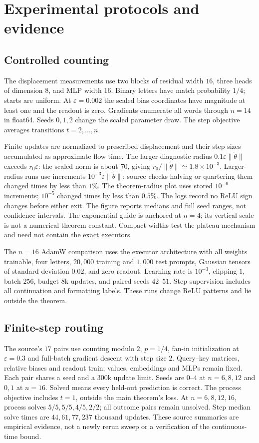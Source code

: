 \section{Experimental protocols and evidence}\label{app:experiments}
\subsection{Controlled counting}
The displacement measurements use two blocks of residual width $16$, three heads of dimension $8$, and MLP width $16$. Binary letters have match probability $1/4$; starts are uniform. At $\varepsilon=0.002$ the scaled bias coordinates have magnitude at least one and the readout is zero. Gradients enumerate all words through $n=14$ in float64. Seeds $0,1,2$ change the scaled parameter draw. The step objective averages transitions $t=2,\ldots,n$.

Finite updates are normalized to prescribed displacement and their step sizes accumulated as approximate flow time. The larger diagnostic radius $0.1\varepsilon\|\tilde\theta\|$ exceeds $r_0\varepsilon$: the scaled norm is about $70$, giving $r_0/\|\tilde\theta\|\simeq1.8\times10^{-3}$. Larger-radius runs use increments $10^{-3}\varepsilon\|\tilde\theta\|$; source checks halving or quartering them changed times by less than $1\%$. The theorem-radius plot uses stored $10^{-6}$ increments; $10^{-5}$ changed times by less than $0.5\%$. The logs record no ReLU sign changes before either exit. The figure reports medians and full seed ranges, not confidence intervals. The exponential guide is anchored at $n=4$; its vertical scale is not a numerical theorem constant. Compact widths test the plateau mechanism and need not contain the exact executors.

The $n=16$ AdamW comparison uses the executor architecture with all weights trainable, four letters, $20{,}000$ training and $1{,}000$ test prompts, Gaussian tensors of standard deviation $0.02$, and zero readout. Learning rate is $10^{-3}$, clipping $1$, batch $256$, budget $8$k updates, and paired seeds $42$--$51$. Step supervision includes all continuation and formatting labels. These runs change ReLU patterns and lie outside the theorem.

\subsection{Finite-step routing}
The source's $17$ pairs use counting modulo $2$, $p=1/4$, fan-in initialization at $\varepsilon=0.3$ and full-batch gradient descent with step size $2$. Query--key matrices, relative biases and readout train; values, embeddings and MLPs remain fixed. Each pair shares a seed and a $300$k update limit. Seeds are $0$--$4$ at $n=6,8,12$ and $0,1$ at $n=16$. Solved means every held-out prediction is correct. The process objective includes $t=1$, outside the main theorem's loss. At $n=6,8,12,16$, process solves $5/5,5/5,4/5,2/2$; all outcome pairs remain unsolved. Step median solve times are $44,61,77,237$ thousand updates. These source summaries are empirical evidence, not a newly rerun sweep or a verification of the continuous-time bound.

